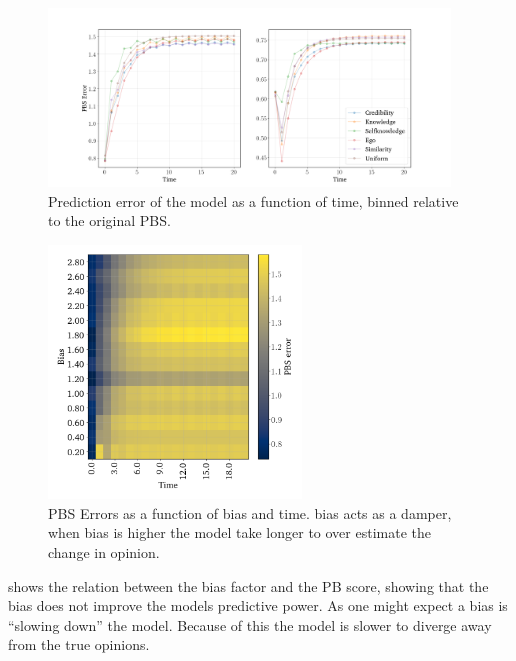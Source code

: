 \begin{figure}[h]
	\begin{center}
		\includegraphics[width=0.95\textwidth]{Figures/errors_binned.png}
	\end{center}
	\caption{Prediction error of the model as a function of time, binned relative to the original  PBS.}\label{fig:binned_errors}
\end{figure}


\begin{figure}[h]
	\centering

	\includegraphics[width=0.6\textwidth]{Figures/bias_time_imshow.png}
	\hspace{1em}
	\caption{PBS Errors as a function of bias and time. bias acts as a damper, when bias is higher the model take longer to over estimate the change in opinion.}
	\label{fig:bias_slowdown}
\end{figure}

 shows the relation between the bias factor and the PB
score, showing that the bias does not improve the models predictive power. As
one might expect a bias is ``slowing down'' the model. Because of this the
model is slower to diverge away from the true opinions.

